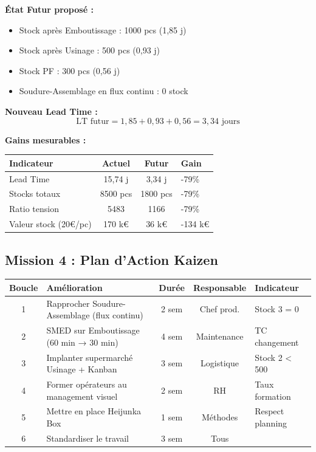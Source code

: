 \documentclass[12pt,a4paper]{article}
\begin{document}
\textbf{État Futur proposé :}

\begin{itemize}
    \item Stock après Emboutissage : 1000 pcs (1,85 j)
    \item Stock après Usinage : 500 pcs (0,93 j)
    \item Stock PF : 300 pcs (0,56 j)
    \item Soudure-Assemblage en flux continu : 0 stock
\end{itemize}

\textbf{Nouveau Lead Time :}
\begin{equation*}
    \text{LT futur} = 1{,}85 + 0{,}93 + 0{,}56 = \boxed{3{,}34 \text{ jours}}
\end{equation*}

\textbf{Gains mesurables :}

\begin{center}
\renewcommand{\arraystretch}{1.5}
\begin{tabular}{lccl}
\toprule
\textbf{Indicateur} & \textbf{Actuel} & \textbf{Futur} & \textbf{Gain} \\
\midrule
Lead Time & 15,74 j & 3,34 j & -79\% \\
Stocks totaux & 8500 pcs & 1800 pcs & -79\% \\
Ratio tension & 5483 & 1166 & -79\% \\
Valeur stock (20€/pc) & 170 k€ & 36 k€ & -134 k€ \\
\bottomrule
\end{tabular}
\end{center}

\subsection{Mission 4 : Plan d'Action Kaizen}

\begin{center}
\renewcommand{\arraystretch}{1.4}
\begin{tabular}{|c|p{5cm}|c|c|p{3cm}|}
\hline
\textbf{Boucle} & \textbf{Amélioration} & \textbf{Durée} & \textbf{Responsable} & \textbf{Indicateur} \\
\hline
1 & Rapprocher Soudure-Assemblage (flux continu) & 2 sem & Chef prod. & Stock 3 = 0 \\
\hline
2 & SMED sur Emboutissage (60 min → 30 min) & 4 sem & Maintenance & TC changement \\
\hline
3 & Implanter supermarché Usinage + Kanban & 3 sem & Logistique & Stock 2 < 500 \\
\hline
4 & Former opérateurs au management visuel & 2 sem & RH & Taux formation \\
\hline
5 & Mettre en place Heijunka Box & 1 sem & Méthodes & Respect planning \\
\hline
6 & Standardiser le travail & 3 sem & Tous & %
\hline
\end{tabular}
\end{center}
\end{document}
